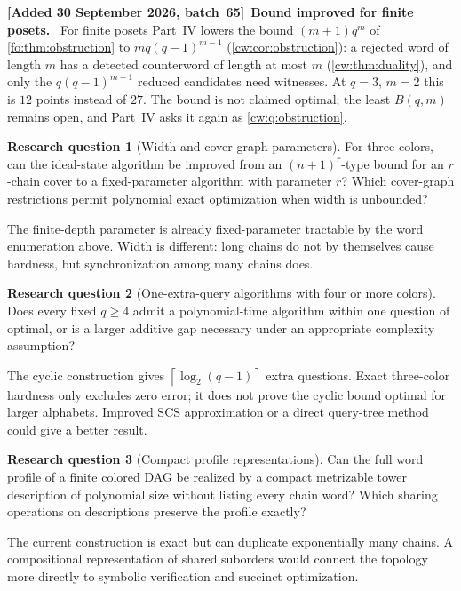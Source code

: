 \documentclass[11pt,letterpaper]{article}
\numberwithin{equation}{section}
\theoremstyle{definition}
\theoremstyle{remark}
\theoremstyle{definition}
\newtheorem{question}{Research question}
\newcommand{\ceil}[1]{\left\lceil#1\right\rceil}
\newenvironment{writenoted}[1][]{\par\smallskip\begingroup\small\sloppy
 \noindent\textbf{[Added 30 September 2026, batch~65]}\if\relax\detokenize{#1}\relax\else~\textbf{#1.}\fi\ }%
 {\par\endgroup\smallskip}
\begin{document}
\begin{writenoted}[Bound improved for finite posets]
For finite posets Part~IV lowers the bound $(m+1)q^m$ of
\cref{fo:thm:obstruction} to $mq(q-1)^{m-1}$ (\cref{cw:cor:obstruction}): a
rejected word of length $m$ has a detected counterword of length at most $m$
(\cref{cw:thm:duality}), and only the $q(q-1)^{m-1}$ reduced candidates need
witnesses. At $q=3$, $m=2$ this is $12$ points instead of $27$. The bound is
not claimed optimal; the least $B(q,m)$ remains open, and Part~IV asks it
again as \cref{cw:q:obstruction}.
\end{writenoted}

\begin{question}[Width and cover-graph parameters]
For three colors, can the ideal-state algorithm be improved from an
$(n+1)^r$-type bound for an $r$-chain cover to a fixed-parameter algorithm with
parameter $r$? Which cover-graph restrictions permit polynomial exact
optimization when width is unbounded?
\end{question}
The finite-depth parameter is already fixed-parameter tractable by the word
enumeration above. Width is different: long chains do not by themselves cause
hardness, but synchronization among many chains does.

\begin{question}[One-extra-query algorithms with four or more colors]
Does every fixed $q\ge4$ admit a polynomial-time algorithm within one question
of optimal, or is a larger additive gap necessary under an appropriate
complexity assumption?
\end{question}
The cyclic construction gives $\ceil{\log_2(q-1)}$ extra questions. Exact
three-color hardness only excludes zero error; it does not prove the cyclic
bound optimal for larger alphabets. Improved SCS approximation or a direct
query-tree method could give a better result.

\begin{question}[Compact profile representations]
Can the full word profile of a finite colored DAG be realized by a compact
metrizable tower description of polynomial size without listing every chain
word? Which sharing operations on descriptions preserve the profile exactly?
\end{question}
The current construction is exact but can duplicate exponentially many chains.
A compositional representation of shared suborders would connect the topology
more directly to symbolic verification and succinct optimization.
\end{document}
